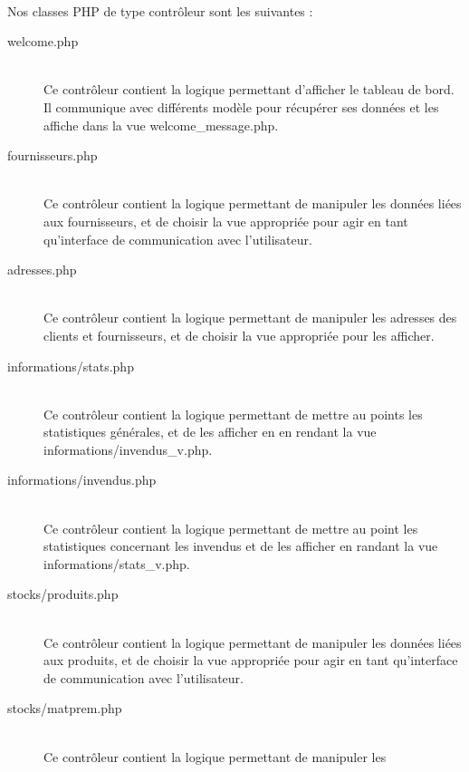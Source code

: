     \paragraph{}
        Nos classes PHP de type contrôleur sont les suivantes :
        \begin{description}
            \item[welcome.php]\hfill \\
                Ce contrôleur contient la logique permettant d'afficher le
                tableau de bord.
                Il communique avec différents modèle pour récupérer ses données
                et les affiche dans la vue welcome\_message.php.
            \item[fournisseurs.php]\hfill \\
                Ce contrôleur contient la logique permettant de manipuler les
                données liées aux fournisseurs, et de choisir la vue
                appropriée pour agir en tant qu'interface de communication 
                avec l'utilisateur.
            \item[adresses.php]\hfill \\
                Ce contrôleur contient la logique permettant de manipuler les
                adresses des clients et fournisseurs, et de choisir la vue
                appropriée pour les afficher.
            \item[informations/stats.php]\hfill \\
                Ce contrôleur contient la logique permettant de mettre au
                points les statistiques générales, et de les afficher en
                en rendant la vue informations/invendus\_v.php.
            \item[informations/invendus.php]\hfill \\
                Ce contrôleur contient la logique permettant de mettre au
                point les statistiques concernant les invendus et de les 
                afficher en randant la vue informations/stats\_v.php.
            \item[stocks/produits.php]\hfill \\
                Ce contrôleur contient la logique permettant de manipuler les
                données liées aux produits, et de choisir la vue appropriée
                pour agir en tant qu'interface de communication avec
                l'utilisateur.
            \item[stocks/matprem.php]\hfill \\
                Ce contrôleur contient la logique permettant de manipuler les

\end{description}
